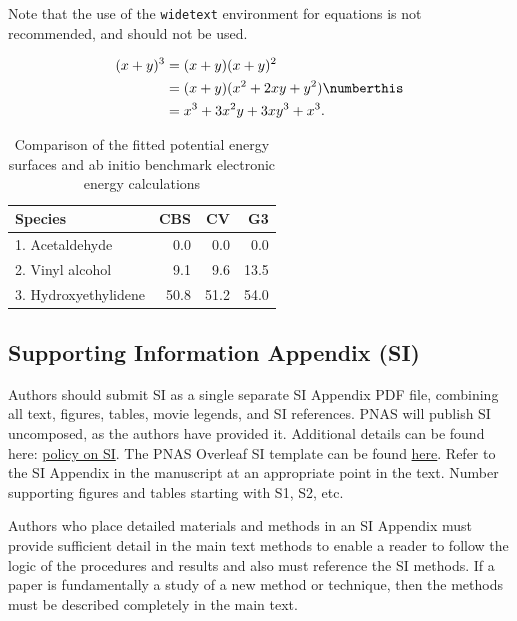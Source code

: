 \documentclass[9pt,twocolumn,twoside]{pnas-new}
\begin{document}
Note that the use of the \verb|widetext| environment for equations is not recommended, and should not be used.

\strip\vspace*{-12pt}
\begin{align*}
(x+y)^3&=(x+y)(x+y)^2\\
       &=(x+y)(x^2+2xy+y^2) \numberthis \label{eqn:example} \\
       &=x^3+3x^2y+3xy^3+x^3.
\end{align*}\vspace*{-12pt}
\endstrip


\begin{table}%
\centering
\caption{Comparison of the fitted potential energy surfaces and ab initio benchmark electronic energy calculations}
\begin{tabular}{lrrr}
Species & CBS & CV & G3 \\
\midrule
1. Acetaldehyde & 0.0 & 0.0 & 0.0 \\
2. Vinyl alcohol & 9.1 & 9.6 & 13.5 \\
3. Hydroxyethylidene & 50.8 & 51.2 & 54.0\\
\bottomrule
\end{tabular}

\end{table}

\subsection*{Supporting Information Appendix (SI)}

Authors should submit SI as a single separate SI Appendix PDF file, combining all text, figures, tables, movie legends, and SI references. PNAS will publish SI uncomposed, as the authors have provided it. Additional details can be found here: \href{https://www.pnas.org/page/authors/format#Supporting_Information}{policy on SI}. The PNAS Overleaf SI template can be found \href{https://www.overleaf.com/latex/templates/pnas-template-for-supplementary-information/wqfsfqwyjtsd}{here}. Refer to the SI Appendix in the manuscript at an appropriate point in the text. Number supporting figures and tables starting with S1, S2, etc.

Authors who place detailed materials and methods in an SI Appendix must provide sufficient detail in the main text methods to enable a reader to follow the logic of the procedures and results and also must reference the SI methods. If a paper is fundamentally a study of a new method or technique, then the methods must be described completely in the main text.
\end{document}
